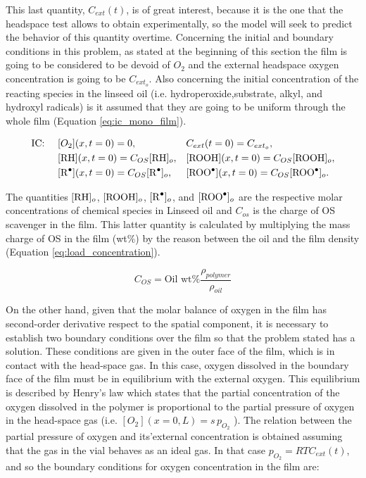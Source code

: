 \begin{refsection}
This last quantity, $C_{ext}(t)$, is of great interest,
because it is the one that the headspace test
allows to obtain experimentally, so the model
will seek to predict the behavior of this quantity
overtime. Concerning the initial and boundary conditions in this problem, as stated at the beginning of this section the film is going to be considered to be devoid of $O_2$ and the external headspace oxygen concentration is going to be $C_{ext_o}$. Also concerning the initial concentration of the reacting species in the linseed oil (i.e. hydroperoxide,substrate, alkyl, and hydroxyl radicals) is it assumed that they are going to be uniform through the whole film (Equation \ref{eq:ic_mono_film}). 

\begin{align}
    &\text{IC: } & &[O_2](x,t=0)=0, & &C_{ext}(t=0)= C_{ext_o},\nonumber\\
    && &[\ce{RH}](x,t=0)=C_{OS}[\ce{RH}]_o,   & &[\ce{ROOH}](x,t=0)=C_{OS}[\ce{ROOH}]_o, \nonumber\\
    && &[\ce{R^.}](x,t=0)=C_{OS}[\ce{R^.}]_o,   & &[\ce{ROO^.}](x,t=0)=C_{OS}[\ce{ROO^.}]_o. 
    \label{eq:ic_mono_film}
\end{align}
    
The quantities $[\ce{RH}]_o$, $[\ce{ROOH}]_o$,  $[\ce{R^.}]_o$, and $[\ce{ROO^.}]_o$ are the respective molar concentrations of chemical species in Linseed oil and $C_{os}$ is the charge of OS scavenger in the film. This latter quantity is calculated by multiplying the mass charge of OS in the film (wt\%) by the reason between the oil and the film density (Equation \ref{eq:load_concentration}).

\begin{equation}
    C_{OS}= \text{Oil wt}\% \frac{\rho_{polymer}}{\rho_{oil}}
    \label{eq:load_concentration}
\end{equation}

On the other hand, given that the molar balance of oxygen in the film has second-order derivative respect to the spatial component, it is necessary to establish two boundary conditions over the film so that the problem stated has a solution. These conditions are given in the outer face of the film, which is in contact with the head-space gas. In this case, oxygen dissolved in the boundary face of the film must be in equilibrium with the external oxygen. This equilibrium is described by Henry's law which states that the partial concentration of the oxygen dissolved in the polymer is proportional to the partial pressure of oxygen in the head-space gas (i.e. $[O_2](x=0, L)=s\hspace{2pt}p_{O_2}$ ). The relation between the partial pressure of oxygen and its'external concentration is obtained assuming that the gas in the vial behaves as an ideal gas.  In that case $p_{O_2}=RTC_{ext}(t)$, and so the boundary conditions for oxygen concentration in the film are:


\end{refsection}
